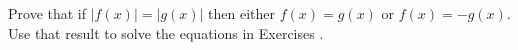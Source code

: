 {\noindent Prove that if $|f(x)| = |g(x)|$ then either $f(x) = g(x)$ or $f(x) = -g(x)$. Use that result to solve the equations in Exercises}
{.}
